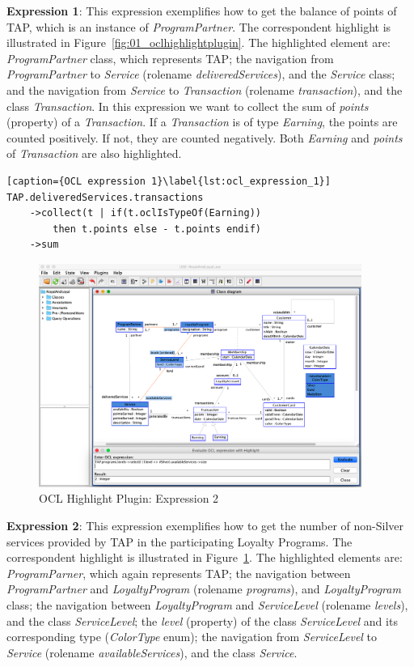 \textbf{Expression 1}: This expression exemplifies how to get the balance of points of TAP, which is an instance of \textit{ProgramPartner}. The correspondent highlight is illustrated in Figure~\ref{fig:01_oclhighlightplugin}. The highlighted element are: \textit{ProgramPartner} class, which represents TAP; the navigation from \textit{ProgramPartner} to \textit{Service} (rolename \textit{deliveredServices}), and the \textit{Service} class; and the navigation from \textit{Service} to \textit{Transaction} (rolename \textit{transaction}), and the class \textit{Transaction}. In this expression we want to collect the sum of \textit{points} (property) of a \textit{Transaction}. If a \textit{Transaction} is of type \textit{Earning}, the points are counted positively. If not, they are counted negatively. Both \textit{Earning} and \textit{points} of \textit{Transaction} are also highlighted.

\begin{lstlisting}[caption={OCL expression 1}\label{lst:ocl_expression_1}]
TAP.deliveredServices.transactions
    ->collect(t | if(t.oclIsTypeOf(Earning)) 
        then t.points else - t.points endif)
    ->sum
\end{lstlisting}

\begin{figure}[ht]
    \centering
    \includegraphics[width=0.94\textwidth]{Chapters/figures/5_Implementation/01_Expression_2}
    \caption{OCL Highlight Plugin: Expression 2}
    \label{fig:02_oclhighlightplugin}
\end{figure}

\textbf{Expression 2}: This expression exemplifies how to get the number of non-Silver services provided by TAP in the participating Loyalty Programs. The correspondent highlight is illustrated in Figure~\ref{fig:02_oclhighlightplugin}. The highlighted elements are: \textit{ProgramParner}, which again represents TAP; the navigation between \textit{ProgramPartner} and \textit{LoyaltyProgram} (rolename \textit{programs}), and \textit{LoyaltyProgram} class; the navigation between \textit{LoyaltyProgram} and \textit{ServiceLevel} (rolename \textit{levels}), and the class \textit{ServiceLevel}; the \textit{level} (property) of the class \textit{ServiceLevel} and its corresponding type (\textit{ColorType} enum); the navigation from \textit{ServiceLevel} to \textit{Service} (rolename \textit{availableServices}), and the class \textit{Service}.

